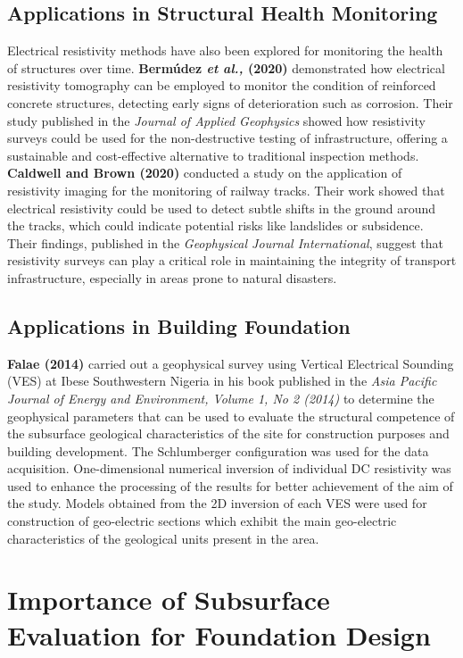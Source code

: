 \documentclass[12pt,a4paper]{report}
\begin{document}
\subsection{Applications in Structural Health Monitoring}
Electrical resistivity methods have also been explored for monitoring the health of structures over time. \textbf{Bermúdez \textit{et al.,} (2020)} demonstrated how electrical resistivity tomography can be employed to monitor the condition of reinforced concrete structures, detecting early signs of deterioration such as corrosion. Their study published in the \textit{Journal of Applied Geophysics} showed how resistivity surveys could be used for the non-destructive testing of infrastructure, offering a sustainable and cost-effective alternative to traditional inspection methods.
\textbf{Caldwell and Brown (2020)} conducted a study on the application of resistivity imaging for the monitoring of railway tracks. Their work showed that electrical resistivity could be used to detect subtle shifts in the ground around the tracks, which could indicate potential risks like landslides or subsidence. Their findings, published in the \textit{Geophysical Journal International}, suggest that resistivity surveys can play a critical role in maintaining the integrity of transport infrastructure, especially in areas prone to natural disasters.

\subsection{Applications in Building Foundation}
\textbf{Falae (2014)} carried out a geophysical survey using Vertical Electrical Sounding (VES) at Ibese Southwestern Nigeria in his book published in the \textit{Asia Pacific Journal of Energy and Environment, Volume 1, No 2 (2014)} to determine the geophysical parameters that can be used to evaluate the structural competence of the subsurface geological characteristics of the site for construction purposes and building development. The Schlumberger configuration was used for the data acquisition. One-dimensional numerical inversion of individual DC resistivity was used to enhance the processing of the results for better achievement of the aim of the study. Models obtained from the 2D inversion of each VES were used for construction of geo-electric sections which exhibit the main geo-electric characteristics of the geological units present in the area. 

\section{Importance of Subsurface Evaluation for Foundation Design}
\end{document}
